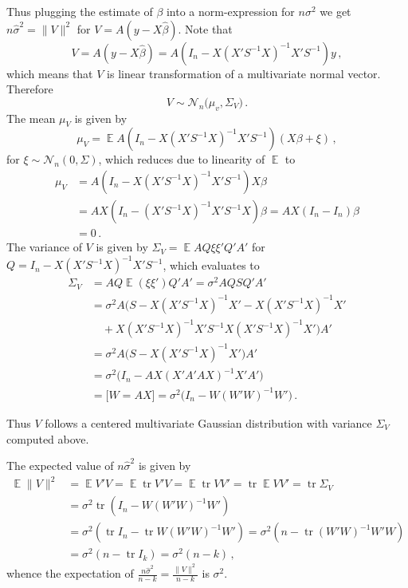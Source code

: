 \documentclass[a4paper,12pt]{extarticle}
\newcommand{\tr}{\mathop{\text{tr}}\nolimits}
\newcommand{\ex}{\mathop{\mathbb{E}}\nolimits}
\begin{document}
Thus plugging the estimate of $\beta$ into a norm-expression for $n\sigma^2$ we get
$n\hat{\sigma}^2 = \|V\|^2$ for $V = A(y-X\hat{\beta})$. Note that
$$ V = A(y-X\hat{\beta}) = A(I_n - X(X'S^{-1}X)^{-1}X'S^{-1}) y \,,$$
which means that $V$ is linear transformation of a multivariate normal vector. Therefore
$$ V \sim \mathcal{N}_n \bigl(\mu_v, \Sigma_V \bigr) \,.$$
The mean $\mu_V$ is given by
$$ \mu_V = \ex A(I_n - X(X'S^{-1}X)^{-1}X'S^{-1}) (X\beta + \xi) \,,$$
for $\xi \sim \mathcal{N}_n(0, \Sigma)$, which reduces due to linearity of $\ex$ to
\begin{align*}
  \mu_V
    &= A(I_n - X(X'S^{-1}X)^{-1}X'S^{-1}) X \beta \\
    &= AX(I_n - (X'S^{-1}X)^{-1}X'S^{-1}X) \beta
     = AX(I_n - I_n) \beta \\
    &= 0
  \,.
\end{align*}
The variance of $V$ is given by $ \Sigma_V = \ex A Q \xi\xi'Q'A'$ for $Q=I_n - X(X'S^{-1}X)^{-1}X'S^{-1}$,
which evaluates to
\begin{align*}
  \Sigma_V
    &= A Q \ex(\xi\xi') Q'A' = \sigma^2 A Q S Q' A' \\
    &= \sigma^2 A \bigl( S - X(X'S^{-1}X)^{-1}X' - X(X'S^{-1}X)^{-1}X' \\
    & \quad + X(X'S^{-1}X)^{-1}X'S^{-1}X(X'S^{-1}X)^{-1}X' \bigr) A'\\
    &= \sigma^2 A \bigl( S - X(X'S^{-1}X)^{-1}X'\bigr) A'\\
    &= \sigma^2 \bigl(I_n - AX(X'A'AX)^{-1}X'A'\bigr)\\
    &= \bigl[W = AX\bigr]=  \sigma^2 \bigl(I_n - W(W'W)^{-1}W'\bigr)\,.
\end{align*}

Thus $V$ follows a centered multivariate Gaussian distribution with variance
$\Sigma_V$ computed above.

The expected value of $n\hat{\sigma}^2$ is given by \begin{align*}
\ex \|V\|^2
  &= \ex V'V = \ex \tr V'V = \ex \tr VV' = \tr \ex VV' = \tr \Sigma_V\\
  &= \sigma^2 \tr (I_n - W(W'W)^{-1}W')\\
  &= \sigma^2 (\tr I_n - \tr W(W'W)^{-1}W') = \sigma^2 (n - \tr (W'W)^{-1}W'W)\\
  &= \sigma^2 (n - \tr I_k) = \sigma^2 (n - k) \,,
\end{align*}
whence the expectation of $\frac{n\hat{\sigma}^2}{n-k} = \frac{\|V\|^2}{n-k}$ is $\sigma^2$.
\end{document}
